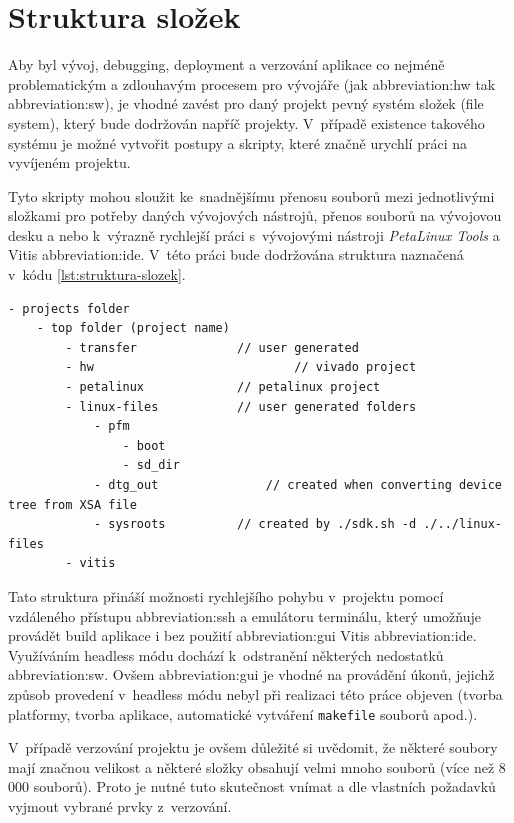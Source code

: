 \documentclass[a4paper, twoside, 11pt]{article}
\begin{document}
	\section{Struktura složek}\label{sec:struktura-slozek}
		Aby byl vývoj, debugging, deployment a verzování aplikace co nejméně problematickým a zdlouhavým procesem pro vývojáře (jak \gls{abbreviation:hw} tak \gls{abbreviation:sw}), je vhodné zavést pro daný projekt pevný systém složek (file system), který bude dodržován napříč projekty. V~případě existence takového systému je možné vytvořit postupy a skripty, které značně urychlí práci na vyvíjeném projektu.\par
		Tyto skripty mohou sloužit ke~snadnějšímu přenosu souborů mezi jednotlivými složkami pro potřeby daných vývojových nástrojů, přenos souborů na vývojovou desku a nebo k~výrazně rychlejší práci s~vývojovými nástroji \textit{PetaLinux Tools} a Vitis \gls{abbreviation:ide}.
		V~této práci bude dodržována struktura naznačená v~kódu \ref{lst:struktura-slozek}.

		\begin{lstlisting}[language={Text}, caption={Struktura složek, využívaná při tvorbě projektů k~dosažení lepšího \gls{abbreviation:dx}.}, label= {lst:struktura-slozek}]
- projects folder
	- top folder (project name)
		- transfer				// user generated
		- hw							// vivado project
		- petalinux				// petalinux project
		- linux-files			// user generated folders
			- pfm
				- boot
				- sd_dir
			- dtg_out				// created when converting device tree from XSA file
			- sysroots			// created by ./sdk.sh -d ./../linux-files
		- vitis\end{lstlisting}

		Tato struktura přináší možnosti rychlejšího pohybu v~projektu pomocí vzdáleného přístupu \gls{abbreviation:ssh} a emulátoru terminálu, který umožňuje provádět build aplikace i bez použití \gls{abbreviation:gui} Vitis \gls{abbreviation:ide}. Využíváním headless módu dochází k~odstranění některých nedostatků \gls{abbreviation:sw}. Ovšem \gls{abbreviation:gui} je vhodné na provádění úkonů, jejichž způsob provedení v~headless módu nebyl při realizaci této práce objeven (tvorba platformy, tvorba aplikace, automatické vytváření \texttt{makefile} souborů apod.).\par
		V~případě verzování projektu je ovšem důležité si uvědomit, že některé soubory mají značnou velikost a některé složky obsahují velmi mnoho souborů (více než 8 000 souborů). Proto je nutné tuto skutečnost vnímat a dle vlastních požadavků vyjmout vybrané prvky z~verzování.
		
\end{document}
